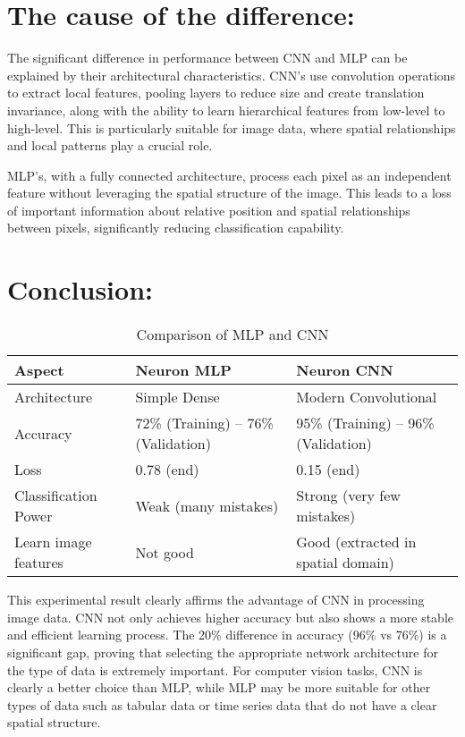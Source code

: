\documentclass[12pt]{article}
\begin{document}
\section{The cause of the difference:}

The significant difference in performance between CNN and MLP can be explained 
by their architectural characteristics. CNN's use convolution operations to 
extract local features, pooling layers to reduce size and create translation 
invariance, along with the ability to learn hierarchical features from 
low-level to high-level. This is particularly suitable for image data, where 
spatial relationships and local patterns play a crucial role.

MLP's, with a fully connected architecture, process each pixel as an 
independent feature without leveraging the spatial structure of the image. 
This leads to a loss of important information about relative position and 
spatial relationships between pixels, significantly reducing classification 
capability.

\section{Conclusion:}

\begin{table}[h!]
    \centering
    \begin{tabular}{@{}lll@{}}
        \toprule
        \textbf{Aspect} & \textbf{Neuron MLP} & \textbf{Neuron CNN} \\
        \midrule
        Architecture & Simple Dense & Modern Convolutional \\
        Accuracy & 72\% (Training) – 76\% (Validation) & 95\% (Training) – 96\% 
        (Validation) \\
        Loss & 0.78 (end) & 0.15 (end) \\
        Classification Power & Weak (many mistakes) & Strong (very few mistakes) \\
        Learn image features & Not good & Good (extracted in spatial domain) \\
        \bottomrule
    \end{tabular}
    \caption*{\small Comparison of MLP and CNN}
\end{table}
\bigskip
\bigskip
\bigskip
\bigskip
\bigskip
{\large This experimental result clearly affirms the advantage of CNN in processing 
image data. CNN not only achieves higher accuracy but also shows a more stable 
and efficient learning process. The 20\% difference in accuracy (96\% vs 76\%) 
is a significant gap, proving that selecting the appropriate network 
architecture for the type of data is extremely important. For computer 
vision tasks, CNN is clearly a better choice than MLP, while MLP may be more 
suitable for other types of data such as tabular data or time series data that 
do not have a clear spatial structure.}
\end{document}

